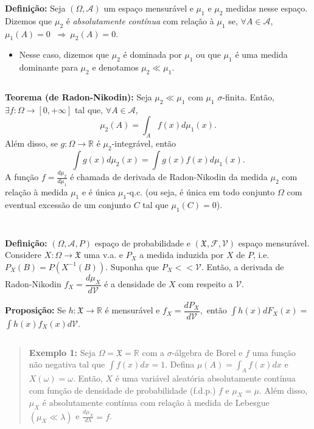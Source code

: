 \documentclass[
]{book}
\providecommand{\tightlist}{%
  \setlength{\itemsep}{0pt}\setlength{\parskip}{0pt}}
\begin{document}
\(~\)

\textbf{Definição:} Seja \((\Omega,\mathcal{A})\) um espaço mensurável e \(\mu_1\) e \(\mu_2\) medidas nesse espaço. Dizemos que \(\mu_2\) é \emph{absolutamente contínua} com relação à \(\mu_1\) se, \(\forall A \in \mathcal{A}\), \(\mu_1(A)=0\) \(~\Rightarrow~ \mu_2(A)=0\).

\begin{itemize}
\tightlist
\item
  Nesse caso, dizemos que \(\mu_2\) é dominada por \(\mu_1\) ou que \(\mu_1\) é uma medida dominante para \(\mu_2\) e denotamos \(\mu_2 \ll \mu_1\).
\end{itemize}

\(~\)

\textbf{Teorema (de Radon-Nikodin):} Seja \(\mu_2 \ll \mu_1\) com \(\mu_1\) \(\sigma\)-finita. Então, \(\exists f: \Omega \longrightarrow [0,+\infty]\) tal que, \(\forall A \in \mathcal{A}\),
\[\mu_2(A) = \int_A f(x) d\mu_1(x).\]
Além disso, se \(g:\Omega \longrightarrow \mathbb{R}\) é \(\mu_2\)-integrável, então
\[\int g(x) d\mu_2(x) = \int g(x) f(x) d\mu_1(x).\]
A função \(f=\frac{d\mu_2}{d\mu_1}\) é chamada de derivada de Radon-Nikodin da medida \(\mu_2\) com relação à medida \(\mu_1\) e é única \(\mu_1\)-q.c. (ou seja, é única em todo conjunto \(\Omega\) com eventual excessão de um conjunto \(C\) tal que \(\mu_1(C)=0\)).

\(~\)

\(~\)

\textbf{Definição:} \((\Omega, \mathcal{A}, P)\) espaço de probabilidade e \((\mathfrak{X},\mathcal{F},\mathcal{V})\) espaço mensurável. Considere \(X: \Omega \longrightarrow \mathfrak{X}\) uma v.a. e \(P_X\) a medida induzida por \(X\) de \(P\), i.e.~\(P_X(B) = P(X^{-1}(B)).\) Suponha que \(P_X << \mathcal{V}\). Então, a derivada de Radon-Nikodin \(f_X = \dfrac{d\mu_X}{d\mathcal{V}}\) é a densidade de \(X\) com respeito a \(\mathcal{V}\).

\textbf{Proposição:} Se \(h: \mathfrak{X}\longrightarrow\mathbb{R}\) é mensurável e \(f_X = \dfrac{dP_X}{d\mathcal{V}},\) então \(\int h(x)dF_X(x)=\) \(\int h(x)f_X(x)d\mathcal{V}.\)

\(~\)

\begin{quote}
\textbf{Exemplo 1:} Seja \(\Omega=\mathfrak{X}=\mathbb{R}\) com a \(\sigma\)-álgebra de Borel e \(f\) uma função não negativa tal que \(\displaystyle\int f(x) dx = 1\). Defina \(\displaystyle\mu(A)= \int_A f(x) dx\) e \(X(\omega)=\omega\). Então, \(X\) é uma variável aleatória absolutamente contínua com função de densidade de probabilidade (f.d.p.) \(f\) e \(\mu_X = \mu\). Além disso, \(\mu_X\) é absolutamente contínua com relação à medida de Lebesgue \((\mu_X \ll \lambda)\) e \(\frac{d\mu_X}{d\lambda}=f\).
\end{quote}
\end{document}
